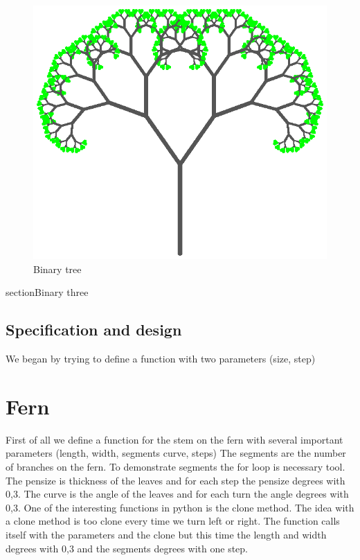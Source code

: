 \documentclass[titlepage]{article}
\begin{document}
\begin{figure}[H]
  \centering
  \includegraphics{bintree}
  \caption{Binary tree}
\end{figure}
section{Binary three}
\subsection{Specification and design}
We began by trying to define a function with two parameters (size, step)
\section{Fern}
First of all we define a function for the stem on the fern with several important parameters (length, width, segments curve, steps)
The segments are the number of branches on the fern. To demonstrate segments the for loop is necessary tool. The pensize is thickness of the leaves and for each step the pensize degrees with 0,3. The curve is the angle of the leaves and for each turn the angle degrees with 0,3. 
One of the interesting functions in python is the clone method. The idea with a clone method is too clone every time we turn left or right. The function calls itself with the parameters and the clone but this time the length and width degrees with 0,3 and the segments degrees with one step.
\end{document}
